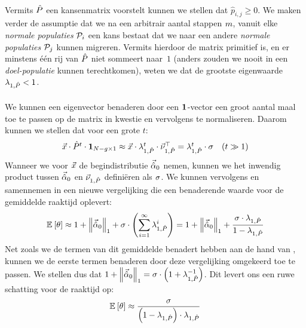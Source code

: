 \paragraph{}
Vermits $\removmat$ een kansenmatrix voorstelt kunnen we stellen dat $\hat{p}_{i,j}\geq 0$. We maken verder de assumptie dat we na een arbitrair aantal stappen $\arbitraryval$, vanuit elke \emph{normale populaties} $\calP_i$ een kans bestaat dat we naar een andere \emph{normale populaties} $\calP_j$ kunnen migreren. Vermits hierdoor de matrix primitief is, en er minstens \'e\'en rij van $\removmat$ niet sommeert naar~$1$ (anders zouden we nooit in een \emph{doel-populatie} kunnen terechtkomen), weten we dat de grootste eigenwaarde $\ev[1,\removmat]<1$.

\paragraph{}
We kunnen een eigenvector benaderen door een $\onematrix$-vector een groot aantal maal toe te passen op de matrix in kwestie en vervolgens te normaliseren. Daarom kunnen we stellen dat voor een grote $t$:
\begin{equation}
\begin{array}{cc}
\arbitraryvec\cdot\removmat^t\cdot\onematrix[\npop-\ntarpop\times1]\approx\arbitraryvec\cdot\ev[1,\removmat]^t\cdot\evr[1,\removmat]^{\top}=\ev[1,\removmat]^t\cdot\metapa&\mbox{($t\gg 1$)}
\end{array}
\eqnlab{longTermAlpha}
\end{equation}
Wanneer we voor $\arbitraryvec$ de begindistributie $\probdistnormmeta{0}$ nemen, kunnen we het inwendig product tussen $\probdistnormmeta{0}$ en $\evr[1,\removmat]$ defini\"eren als $\metapa$. We kunnen vervolgens  en  samennemen in een nieuwe vergelijking die een benaderende waarde voor de gemiddelde raaktijd oplevert:
\begin{equation}
\mean{\hittime}\approx 1+\dabs[1]{\probdistnormmeta{0}}+\metapa\cdot\brak{\displaystyle\sum_{i=1}^{\infty}\ev[1,\removmat]^i}=1+\dabs[1]{\probdistnormmeta{0}}+\displaystyle\frac{\metapa\cdot \ev[1,\removmat]}{1-\ev[1,\removmat]}
\end{equation}
Net zoals we de termen van dit gemiddelde benadert hebben aan de hand van , kunnen we de eerste termen benaderen door deze vergelijking omgekeerd toe te passen. We stellen dus dat $1+\dabs[1]{\probdistnormmeta{0}}=\metapa\cdot\brak{1+\ev[1,\removmat]^{-1}}$. Dit levert ons een ruwe schatting voor de raaktijd op:
\begin{equation}
\mean{\hittime}\approx\displaystyle\frac{\metapa}{\brak{1-\ev[1,\removmat]}\cdot\ev[1,\removmat]}
\eqnlab{hitTimeSingle}
\end{equation}

